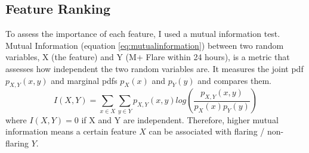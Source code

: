 \documentclass[defaultstyle,11pt]{thesis}
\begin{document}
\subsection{Feature Ranking}
To assess the importance of each feature, I used a mutual information test. Mutual Information (equation \ref{eq:mutualinformation}) between two random variables, X (the feature) and Y (M+ Flare within 24 hours), is a metric that assesses how independent the two random variables are. It measures the joint pdf $p_{X,Y}(x, y)$ and marginal pdfs $p_X(x)$ and $p_Y(y)$ and compares them.
\begin{equation}
    I(X, Y) = \sum_{x \in X}\sum_{y \in Y}p_{X,Y}(x, y)log(\frac{p_{X,Y}(x, y)}{p_X(x)p_Y(y)})
    \label{eq:mutualinformation}
\end{equation}
where $I(X, Y) = 0$ if X and Y are independent. Therefore, higher mutual information means a certain feature $X$ can be associated with flaring / non-flaring $Y$. 
\end{document}
